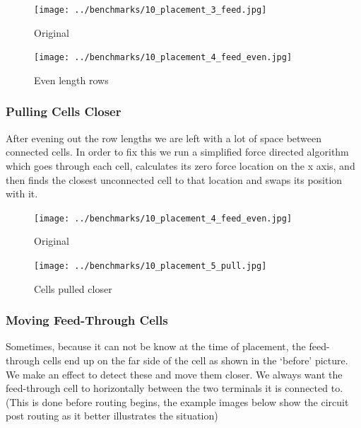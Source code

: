 \documentclass[10pt]{article}
\begin{document}
        \begin{figure}[H]
            \centering
            \texttt{[image: ../benchmarks/10\_placement\_3\_feed.jpg]}
            \caption{Original}
        \end{figure}
        \begin{figure}[H]
            \centering
            \texttt{[image: ../benchmarks/10\_placement\_4\_feed\_even.jpg]}
            \caption{Even length rows}
        \end{figure}

        \subsubsection{Pulling Cells Closer}

        After evening out the row lengths we are left with a lot of space
        between connected cells. In order to fix this we run a simplified force
        directed algorithm which goes through each cell, calculates its zero
        force location on the x axis, and then finds the closest unconnected
        cell to that location and swaps its position with it.

        \begin{figure}[H]
            \centering
            \texttt{[image: ../benchmarks/10\_placement\_4\_feed\_even.jpg]}
            \caption{Original}
        \end{figure}
        \begin{figure}[H]
            \centering
            \texttt{[image: ../benchmarks/10\_placement\_5\_pull.jpg]}
            \caption{Cells pulled closer}
        \end{figure}

        \newpage
        \subsubsection{Moving Feed-Through Cells}

        Sometimes, because it can not be know at the time of placement, the
        feed-through cells end up on the far side of the cell as shown in the
        `before' picture. We make an effect to detect these and move them
        closer.  We always want the feed-through cell to horizontally between
        the two terminals it is connected to. (This is done before routing
        begins, the example images below show the circuit post routing as it
        better illustrates the situation)
\end{document}
